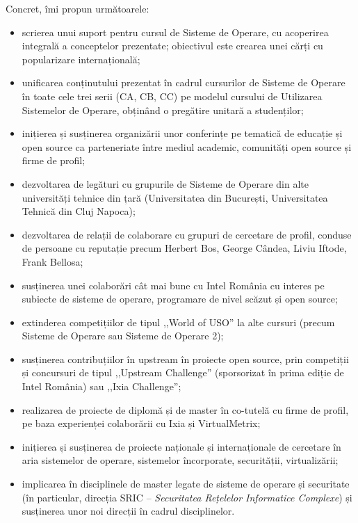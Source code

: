 \documentclass[11pt,a4paper]{article}
\begin{document}
Concret, îmi propun următoarele:
\begin{itemize}
  \item scrierea unui suport pentru cursul de Sisteme de Operare, cu
    acoperirea integrală a conceptelor prezentate; obiectivul este crearea
    unei cărți cu popularizare internațională;
  \item unificarea conținutului prezentat în cadrul cursurilor de Sisteme de
    Operare în toate cele trei serii (CA, CB, CC) pe modelul cursului de
    Utilizarea Sistemelor de Operare, obținând o pregătire unitară a
    studenților;
  \item inițierea și susținerea organizării unor conferințe pe tematică de
    educație și open source ca parteneriate între mediul academic, comunități
    open source și firme de profil;
  \item dezvoltarea de legături cu grupurile de Sisteme de Operare din alte
    universități tehnice din țară (Universitatea din București, Universitatea
    Tehnică din Cluj Napoca);
  \item dezvoltarea de relații de colaborare cu grupuri de cercetare de
    profil, conduse de persoane cu reputație precum Herbert Bos, George
    Cândea, Liviu Iftode, Frank Bellosa;
  \item susținerea unei colaborări cât mai bune cu Intel România cu interes
    pe subiecte de sisteme de operare, programare de nivel scăzut și open
    source;
  \item extinderea competițiilor de tipul ,,World of USO'' la alte cursuri
    (precum Sisteme de Operare sau Sisteme de Operare 2);
  \item susținerea contribuțiilor în upstream în proiecte open source, prin
    competiții și concursuri de tipul ,,Upstream Challenge'' (sporsorizat în
    prima ediție de Intel România) sau ,,Ixia Challenge'';
  \item realizarea de proiecte de diplomă și de master în co-tutelă cu firme
    de profil, pe baza experienței colaborării cu Ixia și VirtualMetrix;
  \item inițierea și susținerea de proiecte naționale și internaționale de
    cercetare în aria sistemelor de operare, sistemelor încorporate,
    securității, virtualizării;
  \item implicarea în disciplinele de master legate de sisteme de operare și
    securitate (în particular, direcția SRIC -- \textit{Securitatea Rețelelor
    Informatice Complexe}) și susținerea unor noi direcții în cadrul
    disciplinelor.
\end{itemize}
\end{document}
